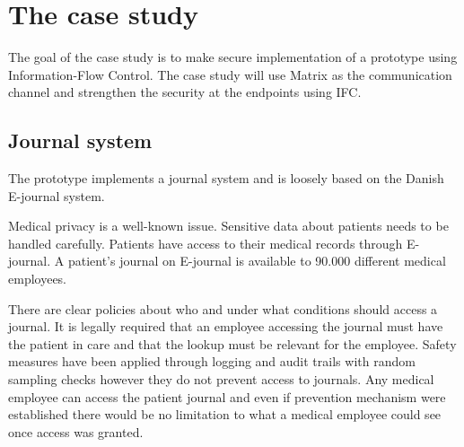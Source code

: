 


\section{The case study} %

The goal of the case study is to make secure implementation of a prototype using Information-Flow Control. The case study will use Matrix as the communication channel and strengthen the security at the endpoints using IFC.

\subsection{Journal system}
The prototype implements a journal system and is loosely based on the Danish E-journal system.

Medical privacy is a well-known issue. Sensitive data about patients needs to be handled carefully. Patients have access to their medical records through E-journal. A patient's journal on E-journal is available to 90.000 different medical employees. 

There are clear policies about who and under what conditions should access a journal. It is legally required that an employee accessing the journal must have the patient in care and that the lookup must be relevant for the employee. Safety measures have been applied through logging and audit trails with random sampling checks however they do not prevent access to journals. Any medical employee can access the patient journal and even if prevention mechanism were established there would be no limitation to what a medical employee could see once access was granted. 



